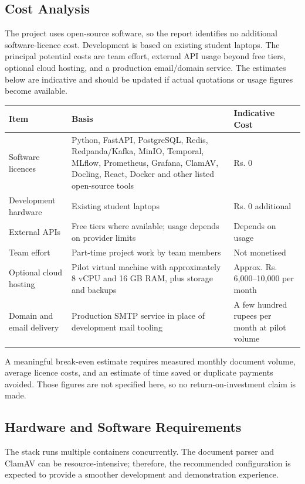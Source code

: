 \documentclass[12pt,a4paper]{report}
\begin{document}
\subsection{Cost Analysis}

The project uses open-source software, so the report identifies no
additional software-licence cost. Development is based on existing
student laptops. The principal potential costs are team effort, external
API usage beyond free tiers, optional cloud hosting, and a production
email/domain service. The estimates below are indicative and should be
updated if actual quotations or usage figures become available.

\begin{longtable}{|p{1.5in}|p{3.5in}|p{1.4in}|}
\hline
\textbf{Item} & \textbf{Basis} & \textbf{Indicative Cost} \\
\hline
Software licences & Python, FastAPI, PostgreSQL, Redis, Redpanda/Kafka,
MinIO, Temporal, MLflow, Prometheus, Grafana, ClamAV, Docling, React,
Docker and other listed open-source tools & Rs. 0 \\
\hline
Development hardware & Existing student laptops & Rs. 0 additional \\
\hline
External APIs & Free tiers where available; usage depends on provider
limits & Depends on usage \\
\hline
Team effort & Part-time project work by team members & Not monetised \\
\hline
Optional cloud hosting & Pilot virtual machine with approximately
8 vCPU and 16 GB RAM, plus storage and backups &
Approx. Rs. 6,000--10,000 per month \\
\hline
Domain and email delivery & Production SMTP service in place of
development mail tooling & A few hundred rupees per month at pilot
volume \\
\hline
\end{longtable}

A meaningful break-even estimate requires measured monthly document
volume, average licence costs, and an estimate of time saved or duplicate
payments avoided. Those figures are not specified here, so no
return-on-investment claim is made.

\subsection{Hardware and Software Requirements}

The stack runs multiple containers concurrently. The document parser
and ClamAV can be resource-intensive; therefore, the recommended
configuration is expected to provide a smoother development and
demonstration experience.
\end{document}
